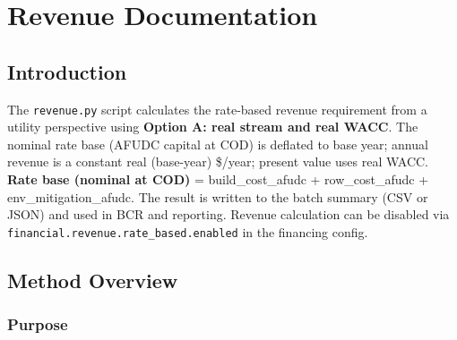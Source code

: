 \documentclass[ctcc_full_documentation.tex]{subfiles}
\begin{document}
\chapter{Revenue Documentation}

\section{Introduction}

The \texttt{revenue.py} script calculates the rate-based revenue requirement from a utility perspective using \textbf{Option A: real stream and real WACC}. The nominal rate base (AFUDC capital at COD) is deflated to base year; annual revenue is a constant real (base-year) \$/year; present value uses real WACC. \textbf{Rate base (nominal at COD)} = build\_cost\_afudc + row\_cost\_afudc + env\_mitigation\_afudc. The result is written to the batch summary (CSV or JSON) and used in BCR and reporting. Revenue calculation can be disabled via \texttt{financial.revenue.rate\_based.enabled} in the financing config.

\section{Method Overview}

\subsection{Purpose}
\end{document}
